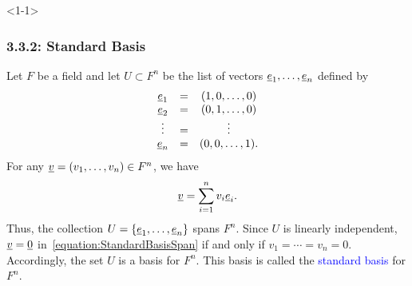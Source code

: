 \documentclass[10pt,english,aspectratio=169]{beamer}
\begin{document}
\begin{frame}<1-1> \frametitle{3.3.2: Standard Basis}
\begin{example}
Let $F$ be a field and let $U \subset F^n$ be the list of vectors $\underline{e}_1, \ldots, \underline{e}_n$ defined by
\begin{equation*}
\begin{array}{ccc}
\underline{e}_1 & = & (1, 0, \ldots, 0) \\
\underline{e}_2 & = & (0, 1, \ldots, 0) \\
\vdots & = & \vdots \\
\underline{e}_n & = & (0, 0, \ldots, 1).
\end{array}
\end{equation*}
For any $\underline{v} = (v_1, \ldots, v_n) \in F^n$, we have
\begin{equation} \label{equation:StandardBasisSpan}
\underline{v} = \sum_{i=1}^n v_i \underline{e}_i.
\end{equation}
Thus, the collection $U = \left\{ \underline{e}_1, \ldots, \underline{e}_n \right\}$ spans $F^n$.
Since $U$ is linearly independent, $\underline{v} = \underline{0}$ in~\eqref{equation:StandardBasisSpan} if and only if $v_1 = \cdots = v_n = 0$.
Accordingly, the set $U$ is a basis for $F^{n}$.
This basis is called the \textcolor{blue}{standard basis} for $F^n$.
\end{example}


\end{frame}
\end{document}
